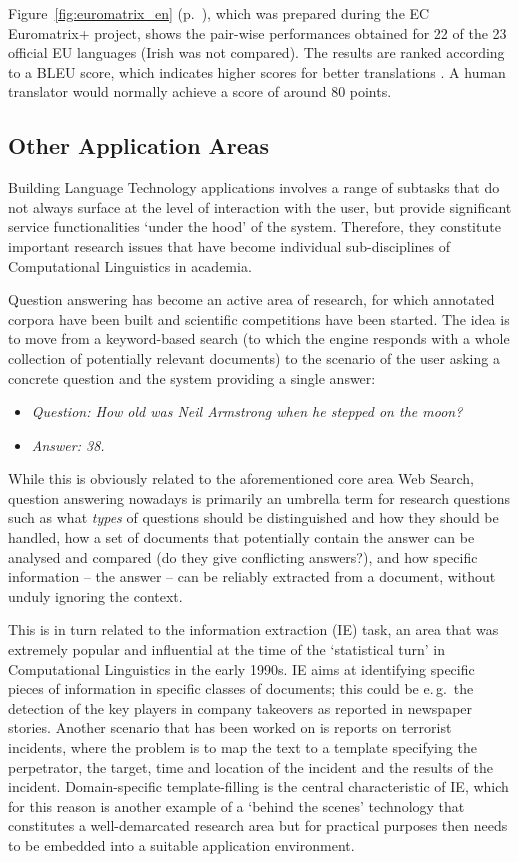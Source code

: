 \begin{multicols}{2}
Figure~\ref{fig:euromatrix_en} (p.~\pageref{fig:euromatrix_en}), which was prepared during the EC Euromatrix+ project, shows the pair-wise performances obtained for 22 of the 23 official EU languages (Irish was not compared). The results are ranked according to a BLEU score, which indicates higher scores for better translations \cite{bleu1}. A human translator would normally achieve a score of around 80 points.

\subsection{Other Application Areas}
Building Language Technology applications involves a range of subtasks that do not always surface at the level of interaction with the user, but provide significant service functionalities ‘under the hood’ of the system. Therefore, they constitute important research issues that have become individual sub-disciplines of Computational Linguistics in academia. 

Question answering has become an active area of research, for which annotated corpora have been built and scientific competitions have been started. The idea is to move from a keyword-based search (to which the engine responds with a whole collection of potentially relevant documents) to the scenario of the user asking a concrete question and the system providing a single answer:
\begin{itemize}
	\item[] \textit{Question: How old was Neil Armstrong when he stepped on the moon?}
	\item[] \textit{Answer: 38.}
\end{itemize}
While this is obviously related to the aforementioned core area Web Search, question answering nowadays is primarily an umbrella term for research questions such as what \emph{types} of questions should be distinguished and how they should be handled, how a set of documents that potentially contain the answer can be analysed and compared (do they give conflicting answers?), and how specific information – the answer – can be reliably extracted from a document, without unduly ignoring the context. 

This is in turn related to the information extraction (IE) task, an area that was extremely popular and influential at the time of the ‘statistical turn’ in Computational Linguistics in the early 1990s. IE aims at identifying specific pieces of information in specific classes of documents; this could be e.\,g.~the detection of the key players in company takeovers as reported in newspaper stories. Another scenario that has been worked on is reports on terrorist incidents, where the problem is to map the text to a template specifying the perpetrator, the target, time and location of the incident and the results of the incident. Domain-specific template-filling is the central characteristic of IE, which for this reason is another example of a ‘behind the scenes’ technology that constitutes a well-demarcated research area but for practical purposes then needs to be embedded into a suitable application environment. 


\end{multicols}
